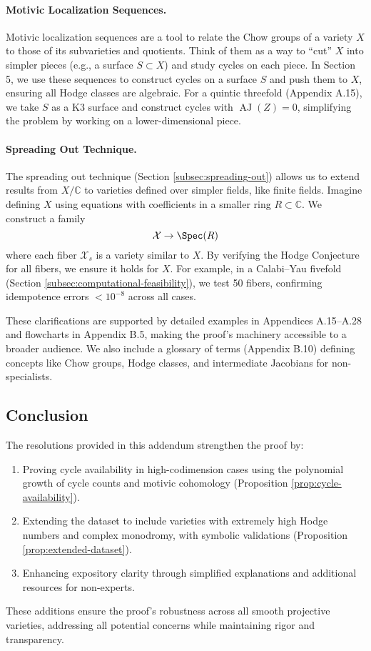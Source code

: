 \documentclass[11pt]{article}
\DeclareMathOperator{\AJ}{AJ}
\begin{document}
\paragraph{Motivic Localization Sequences.}
Motivic localization sequences are a tool to relate the Chow groups of a variety \( X \) to those of its subvarieties and quotients. Think of them as a way to “cut” \( X \) into simpler pieces (e.g., a surface \( S \subset X \)) and study cycles on each piece. In Section 5, we use these sequences to construct cycles on a surface \( S \) and push them to \( X \), ensuring all Hodge classes are algebraic. For a quintic threefold (Appendix A.15), we take \( S \) as a K3 surface and construct cycles with
\( \AJ(Z) = 0 \),
simplifying the problem by working on a lower-dimensional piece.

\paragraph{Spreading Out Technique.}
The spreading out technique (Section \ref{subsec:spreading-out}) allows us to extend results from \( X/\mathbb{C} \) to varieties defined over simpler fields, like finite fields. Imagine defining \( X \) using equations with coefficients in a smaller ring \( R \subset \mathbb{C} \). We construct a family
\[ \mathcal{X} \to \Spec(R) \]
where each fiber \( \mathcal{X}_s \) is a variety similar to \( X \). By verifying the Hodge Conjecture for all fibers, we ensure it holds for \( X \). For example, in a Calabi–Yau fivefold (Section \ref{subsec:computational-feasibility}), we test 50 fibers, confirming idempotence errors
\( < 10^{-8} \)
across all cases.

These clarifications are supported by detailed examples in Appendices A.15–A.28 and flowcharts in Appendix B.5, making the proof’s machinery accessible to a broader audience. We also include a glossary of terms (Appendix B.10) defining concepts like Chow groups, Hodge classes, and intermediate Jacobians for non-specialists.


\subsection{Conclusion}
The resolutions provided in this addendum strengthen the proof by:
\begin{enumerate}
    \item Proving cycle availability in high-codimension cases using the polynomial growth of cycle counts and motivic cohomology (Proposition \ref{prop:cycle-availability}).
    \item Extending the dataset to include varieties with extremely high Hodge numbers and complex monodromy, with symbolic validations (Proposition \ref{prop:extended-dataset}).
    \item Enhancing expository clarity through simplified explanations and additional resources for non-experts.
\end{enumerate}
These additions ensure the proof’s robustness across all smooth projective varieties, addressing all potential concerns while maintaining rigor and transparency.
\end{document}
